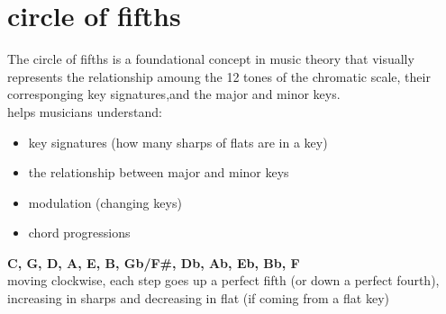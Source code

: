 \documentclass{article}
\begin{document}
\section*{circle of fifths}

The circle of fifths is a foundational concept in music theory that visually represents the relationship amoung the 12 tones of the chromatic scale, their corresponging key signatures,and the major and minor keys.\\

helps musicians understand:
	\begin{itemize}
		\item key signatures (how many sharps of flats are in a key)
		\item the relationship between major and minor keys
		\item modulation (changing keys)
		\item chord progressions
	\end{itemize}

\textbf{C, G, D, A, E, B, Gb/F\#, Db, Ab, Eb, Bb, F}\\
moving clockwise, each step goes up a perfect fifth (or down a perfect fourth), increasing in sharps and decreasing in flat (if coming from a flat key)
\end{document}
